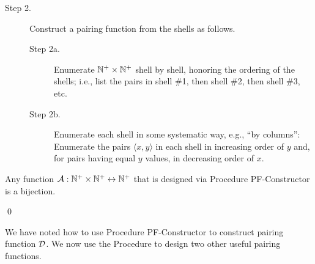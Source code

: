 \begin{description}
\item[Step 2.]
Construct a pairing function from the shells as follows.
  \begin{description}
  \item[Step 2a.]
Enumerate $\mathbb{N}^+ \times \mathbb{N}^+$ shell by shell, honoring the ordering of
the shells; i.e., list the pairs in shell \#1, then shell \#2, then
shell \#3, etc.
  \item[Step 2b.]
Enumerate each shell in some systematic way, e.g., ``by columns'':
Enumerate the pairs $\langle x,y \rangle$ in each shell in increasing
order of $y$ and, for pairs having equal $y$ values, in decreasing
order of $x$.
  \end{description}
\end{description}

\begin{prop}
\label{thm:PF-construct}
Any function $\mbox{$\cal A$}: \mathbb{N}^+ \times \mathbb{N}^+ \leftrightarrow \mathbb{N}^+$ that is
designed via Procedure {\small\sf PF-Constructor} is a bijection.
\end{prop}

  \qed

We have noted how to use Procedure {\small\sf PF-Constructor} to
construct pairing function $\mbox{$\cal D$}$.  We now use the Procedure to design
two other useful pairing functions.

\medskip

